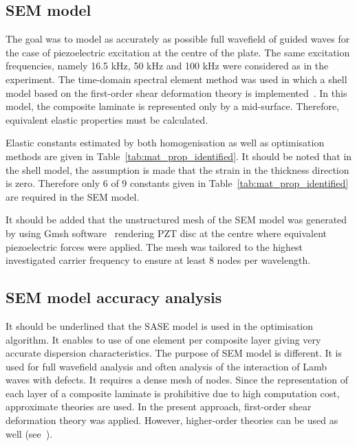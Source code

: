 \documentclass[preprint,12pt]{elsarticle}
\begin{document}
\subsection{SEM model}
The goal was to model as accurately as possible full wavefield of guided waves for the case of piezoelectric excitation at the centre of the plate. 
The same excitation frequencies, namely 16.5 kHz, 50 kHz and 100 kHz were considered as in the experiment. 
The time-domain spectral element method was used in which a shell model based on the first-order shear deformation theory is implemented~\cite{Kudela2020a}. 
In this model, the composite laminate is represented only by a mid-surface. Therefore, equivalent elastic properties must be calculated. 

Elastic constants estimated by both homogenisation as well as optimisation methods are given in Table~\ref{tab:mat_prop_identified}. 
It should be noted that in the shell model, the assumption is made that the strain in the thickness direction is zero. 
Therefore only 6 of 9 constants given in Table~\ref{tab:mat_prop_identified} are required in the SEM model.

It should be added that the unstructured mesh of the SEM model was generated by using Gmsh software~\cite{Geuzaine2009} rendering PZT disc at the centre where equivalent piezoelectric forces were applied. 
The mesh was tailored to the highest investigated carrier frequency to ensure at least 8 nodes per wavelength.

\subsection{SEM model accuracy analysis}
It should be underlined that the SASE model is used in the optimisation algorithm. 
It enables to use of one element per composite layer giving very accurate dispersion characteristics. The purpose of SEM model is different. 
It is used for full wavefield analysis and often analysis of the interaction of Lamb waves with defects. 
It requires a dense mesh of nodes. 
Since the representation of each layer of a composite laminate is prohibitive due to high computation cost, approximate theories are used. 
In the present approach, first-order shear deformation theory was applied. 
However, higher-order theories can be used as well (see~\cite{Ostachowicz2012}).
\end{document}
